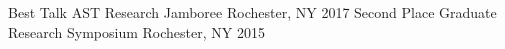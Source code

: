 \begin{cvhonors}
  \cvhonor
    {Best Talk}
    {AST Research Jamboree}
    {Rochester, NY}
    {2017}  
  \cvhonor
    {Second Place}
    {Graduate Research Symposium}
    {Rochester, NY}
    {2015}  

\end{cvhonors}